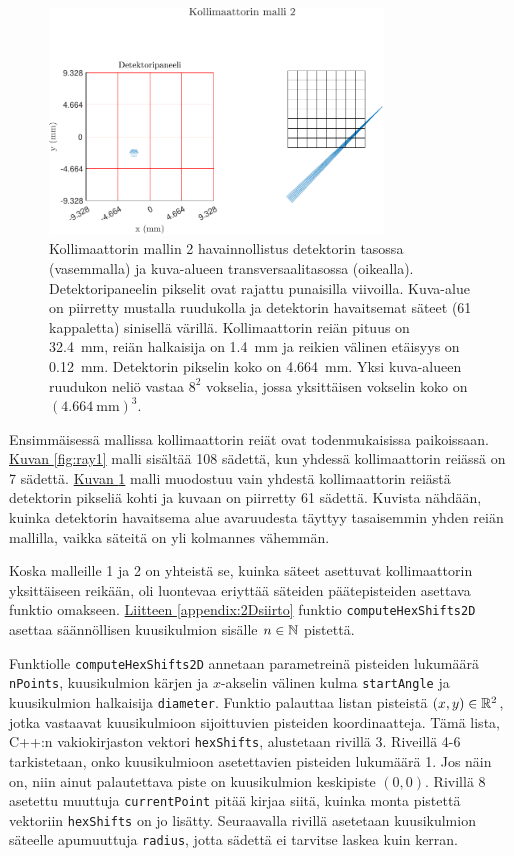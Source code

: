 \begin{figure}[H]
    \centering
    \captionsetup{width=.9\textwidth}
    \includegraphics[height=6cm]{kuvat/malli2.pdf}
    \caption{Kollimaattorin mallin 2 havainnollistus detektorin tasossa (vasemmalla) ja kuva-alueen transversaalitasossa (oikealla). Detektoripaneelin pikselit ovat rajattu punaisilla viivoilla. Kuva-alue on piirretty mustalla ruudukolla ja detektorin havaitsemat säteet (61 kappaletta) sinisellä värillä. Kollimaattorin reiän pituus on \qty{32.4}{\milli\meter}, reiän halkaisija on \qty{1.4}{\milli\meter} ja reikien välinen etäisyys on \qty{0.12}{\milli\meter}. Detektorin pikselin koko on \qty{4.664}{\milli\meter}. Yksi kuva-alueen ruudukon neliö vastaa $8^2$ vokselia, jossa yksittäisen vokselin koko on $(\qty{4.664}{\milli\meter})^{3}$.}
    \label{fig:ray2}
\end{figure}

Ensimmäisessä mallissa kollimaattorin reiät ovat todenmukaisissa paikoissaan. \hyperref[fig:ray1]{Kuvan \ref*{fig:ray1}} malli sisältää 108 sädettä, kun yhdessä kollimaattorin reiässä on 7 sädettä. \hyperref[fig:ray1]{Kuvan \ref*{fig:ray2}} malli muodostuu vain yhdestä kollimaattorin reiästä detektorin pikseliä kohti ja kuvaan on piirretty 61 sädettä. Kuvista nähdään, kuinka detektorin havaitsema alue avaruudesta täyttyy tasaisemmin yhden reiän mallilla, vaikka säteitä on yli kolmannes vähemmän.

Koska malleille 1 ja 2 on yhteistä se, kuinka säteet asettuvat kollimaattorin yksittäiseen reikään, oli luontevaa eriyttää säteiden päätepisteiden asettava funktio omakseen. \hyperref[appendix:2Dsiirto]{Liitteen \ref*{appendix:2Dsiirto}} funktio \texttt{computeHexShifts2D} asettaa säännöllisen kuusikulmion sisälle $n\in\mathbb{N}$ pistettä.

Funktiolle \texttt{computeHexShifts2D} annetaan parametreinä pisteiden lukumäärä \texttt{nPoints}, kuusikulmion kärjen ja $x$-akselin välinen kulma \texttt{startAngle} ja kuusikulmion halkaisija \texttt{diameter}. Funktio palauttaa listan pisteistä $(x, y)\in\mathbb{R}^2$, jotka vastaavat kuusikulmioon sijoittuvien pisteiden koordinaatteja. Tämä lista, C++:n vakiokirjaston vektori \texttt{hexShifts}, alustetaan rivillä 3. Riveillä 4-6 tarkistetaan, onko kuusikulmioon asetettavien pisteiden lukumäärä 1. Jos näin on, niin ainut palautettava piste on kuusikulmion keskipiste $(0, 0)$. Rivillä 8 asetettu muuttuja \texttt{currentPoint} pitää kirjaa siitä, kuinka monta pistettä vektoriin \texttt{hexShifts} on jo lisätty. Seuraavalla rivillä asetetaan kuusikulmion säteelle apumuuttuja \texttt{radius}, jotta sädettä ei tarvitse laskea kuin kerran.

